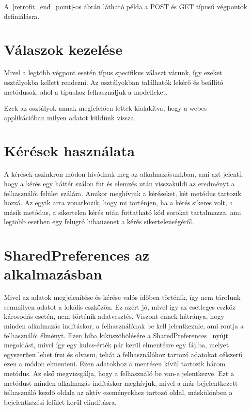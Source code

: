 \documentclass[
]{thesis-ekf}
\theoremstyle{definition}
\theoremstyle{remark}
\begin{document}
	A~\ref{retrofit_end_point}-os ábrán látható példa a POST és GET típusú végpontok definiálásra.
	
	
	
	\section{Válaszok kezelése}
	Mivel a legtöbb végpont esetén típus specifikus választ várunk, így ezeket osztályokba kellett rendezni. Az osztályokban találhatók lekérő és beállító metódusok, ahol a típushoz felhasználjuk a modelleket.
	
	Ezek az osztályok annak megfelelően lettek kialakítva, hogy a webes applikációban milyen adatot küldünk vissza.
	
	\section{Kérések használata}
	A kérések aszinkron módon hívódnak meg az alkalmazásunkban, ami azt jelenti, hogy a kérés egy háttér szálon fut és elemzés után visszaküldi az eredményt a felhasználói felület szálára. Amikor meghívjuk a kéréseket, két metódus tartozik hozzá. Az egyik arra vonatkozik, hogy mi történjen, ha a kérés sikeres volt, a másik metódus, a sikertelen kérés után futtatható kód sorokat tartalmazza, ami legtöbb esetben egy felugró hibaüzenet a kérés sikertelenségéről.
	
	\section{SharedPreferences az alkalmazásban}
	Mivel az adatok megjelenítése és kérése valós időben történik, így nem tárolunk semmilyen adatot a lokális eszközön. Ez azért jó, mivel így az esetleges eszköz károsodás esetén, nem történik adatvesztés. Viszont ennek hátránya, hogy minden alkalmazás indításkor, a felhasználónak be kell jelentkeznie, ami rontja a felhasználói élményt. Ezen hiba kiküszöbölésére a SharedPreferences~\cite{sharedPref_android} nyújt megoldást, mivel így egy kulcs-érték pár kerül elmentésre egy fájlba, melyet egyszerűen lehet írni és olvasni, tehát a felhasználóhoz tartozó adatokat célszerű ezen a módon elmenteni.
	Ezen adatokhoz a mentésen kívül tartozik három metódus. Az első megvizsgálja, hogy a felhasználó be van-e jelentkezve. Ezt a metódust minden alkalmazás indításkor meghívjuk, mivel a már bejelentkezett felhasználó kezdő oldala az aktív eseményekhez tartozó oldal, máskülönben a bejelentkezési felület kerül elindításra.
	
\end{document}
